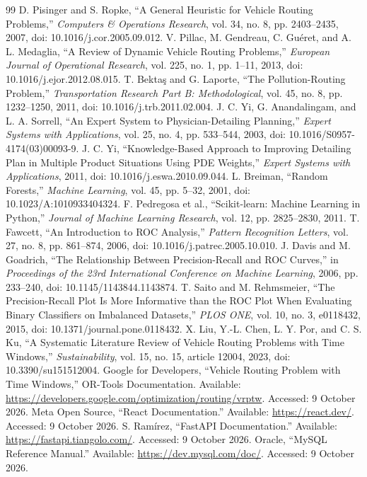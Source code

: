 \documentclass[12pt,a4paper,oneside]{report}
\begin{document}
\begin{thebibliography}{99}
 D. Pisinger and S. Ropke, ``A General Heuristic for Vehicle Routing Problems,'' \textit{Computers \& Operations Research}, vol. 34, no. 8, pp. 2403--2435, 2007, doi: 10.1016/j.cor.2005.09.012.
 V. Pillac, M. Gendreau, C. Gu\'eret, and A. L. Medaglia, ``A Review of Dynamic Vehicle Routing Problems,'' \textit{European Journal of Operational Research}, vol. 225, no. 1, pp. 1--11, 2013, doi: 10.1016/j.ejor.2012.08.015.
 T. Bekta\c{s} and G. Laporte, ``The Pollution-Routing Problem,'' \textit{Transportation Research Part B: Methodological}, vol. 45, no. 8, pp. 1232--1250, 2011, doi: 10.1016/j.trb.2011.02.004.
 J. C. Yi, G. Anandalingam, and L. A. Sorrell, ``An Expert System to Physician-Detailing Planning,'' \textit{Expert Systems with Applications}, vol. 25, no. 4, pp. 533--544, 2003, doi: 10.1016/S0957-4174(03)00093-9.
 J. C. Yi, ``Knowledge-Based Approach to Improving Detailing Plan in Multiple Product Situations Using PDE Weights,'' \textit{Expert Systems with Applications}, 2011, doi: 10.1016/j.eswa.2010.09.044.
 L. Breiman, ``Random Forests,'' \textit{Machine Learning}, vol. 45, pp. 5--32, 2001, doi: 10.1023/A:1010933404324.
 F. Pedregosa et al., ``Scikit-learn: Machine Learning in Python,'' \textit{Journal of Machine Learning Research}, vol. 12, pp. 2825--2830, 2011.
 T. Fawcett, ``An Introduction to ROC Analysis,'' \textit{Pattern Recognition Letters}, vol. 27, no. 8, pp. 861--874, 2006, doi: 10.1016/j.patrec.2005.10.010.
 J. Davis and M. Goadrich, ``The Relationship Between Precision-Recall and ROC Curves,'' in \textit{Proceedings of the 23rd International Conference on Machine Learning}, 2006, pp. 233--240, doi: 10.1145/1143844.1143874.
 T. Saito and M. Rehmsmeier, ``The Precision-Recall Plot Is More Informative than the ROC Plot When Evaluating Binary Classifiers on Imbalanced Datasets,'' \textit{PLOS ONE}, vol. 10, no. 3, e0118432, 2015, doi: 10.1371/journal.pone.0118432.
 X. Liu, Y.-L. Chen, L. Y. Por, and C. S. Ku, ``A Systematic Literature Review of Vehicle Routing Problems with Time Windows,'' \textit{Sustainability}, vol. 15, no. 15, article 12004, 2023, doi: 10.3390/su151512004.
 Google for Developers, ``Vehicle Routing Problem with Time Windows,'' OR-Tools Documentation. Available: \url{https://developers.google.com/optimization/routing/vrptw}. Accessed: 9 October 2026.
 Meta Open Source, ``React Documentation.'' Available: \url{https://react.dev/}. Accessed: 9 October 2026.
 S. Ram\'irez, ``FastAPI Documentation.'' Available: \url{https://fastapi.tiangolo.com/}. Accessed: 9 October 2026.
 Oracle, ``MySQL Reference Manual.'' Available: \url{https://dev.mysql.com/doc/}. Accessed: 9 October 2026.
\end{thebibliography}
\end{document}
